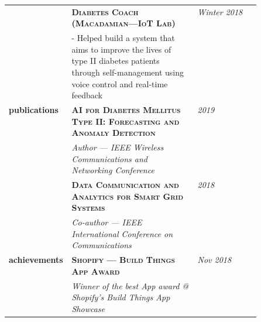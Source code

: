 \documentclass{article}
\begin{document}
\begin{longtable}{@{}>{\raggedleft}p{0.25\linewidth}
                          p{}>{}p{0.25\linewidth}@{}}
            & \textbf{\textsc{Diabetes Coach (Macadamian---IoT Lab)}} & \textit{Winter 2018} \\
            & - Helped build a system that aims to improve the lives of type II diabetes patients through self-management using voice control and real-time feedback \\ [2em]

        \textbf{publications}
            & \textbf{\textsc{AI for Diabetes Mellitus Type II: Forecasting and Anomaly Detection}} & \textit{2019}\\
            & \textit{Author --- IEEE Wireless Communications and Networking Conference}  \\ [1em]

            & \textbf{\textsc{Data Communication and Analytics for Smart Grid Systems}} & \textit{2018}\\
            & \textit{Co-author --- IEEE International Conference on Communications}\\ [1em]

        \textbf{achievements}
            & \textbf{\textsc{Shopify --- Build Things App Award}} & \textit{Nov 2018} \\
            & \textit{Winner of the best App award @ Shopify's Build Things App Showcase} \\ [1em]

  \end{longtable}
\end{document}
